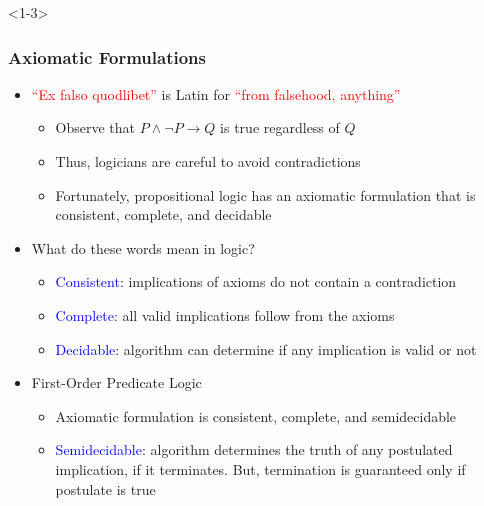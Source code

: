 \documentclass[10pt,english,aspectratio=169]{beamer}
\begin{document}
\begin{frame}<1-3> \frametitle{Axiomatic Formulations}

\begin{itemize}
\setlength\itemsep{3mm}
\item<1-> \textcolor{red}{``Ex falso quodlibet''} is Latin for \textcolor{red}{``from falsehood, anything''} \vspace{1mm}
\begin{itemize}
 \setlength\itemsep{1.5mm}
 \item Observe that $P \wedge \neg P \rightarrow Q$ is true regardless of $Q$
 \item Thus, logicians are careful to avoid contradictions
 \item Fortunately, propositional logic has an axiomatic formulation that is consistent, complete, and decidable
\end{itemize} 

\item<2-> What do these words mean in logic? \vspace{1mm}
\begin{itemize} 
 \setlength\itemsep{1.5mm}
 \item \textcolor{blue}{Consistent}: implications of axioms do not contain a contradiction
 \item \textcolor{blue}{Complete}: all valid implications follow from the axioms
 \item \textcolor{blue}{Decidable}: algorithm can determine if any implication is valid or not
\end{itemize}

\item<3-> First-Order Predicate Logic \vspace{1mm}
\begin{itemize} 
 \setlength\itemsep{1.5mm}
 \item Axiomatic formulation is consistent, complete, and semidecidable
 \item \textcolor{blue}{Semidecidable}:  algorithm determines the truth of any postulated implication, if it terminates.  But, termination is guaranteed only if postulate is true
\end{itemize}
\end{itemize}


\end{frame}
\end{document}
